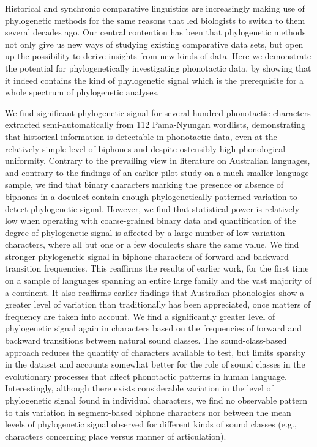 Historical and synchronic comparative linguistics are increasingly making use of phylogenetic methods for the same reasons that led biologists to switch to them several decades ago. Our central contention has been that phylogenetic methods not only give us new ways of studying existing comparative data sets, but open up the possibility to derive insights from new kinds of data. Here we demonstrate the potential for phylogenetically investigating phonotactic data, by showing that it indeed contains the kind of phylogenetic signal which is the prerequisite for a whole spectrum of phylogenetic analyses.

We find significant phylogenetic signal for several hundred phonotactic characters extracted semi-automatically from 112 Pama-Nyungan wordlists, demonstrating that historical information is detectable in phonotactic data, even at the relatively simple level of biphones and despite ostensibly high phonological uniformity. Contrary to the prevailing view in literature on Australian languages, and contrary to the findings of an earlier pilot study on a much smaller language sample, we find that binary characters marking the presence or absence of biphones in a doculect contain enough phylogenetically-patterned variation to detect phylogenetic signal. However, we find that statistical power is relatively low when operating with coarse-grained binary data and quantification of the degree of phylogenetic signal is affected by a large number of low-variation characters, where all but one or a few doculects share the same value. We find stronger phylogenetic signal in biphone characters of forward and backward transition frequencies. This reaffirms the results of earlier work, for the first time on a sample of languages spanning an entire large family and the vast majority of a continent. It also reaffirms earlier findings that Australian phonologies show a greater level of variation than traditionally has been appreciated, once matters of frequency are taken into account. We find a significantly greater level of phylogenetic signal again in characters based on the frequencies of forward and backward transitions between natural sound classes. The sound-class-based approach reduces the quantity of characters available to test, but limits sparsity in the dataset and accounts somewhat better for the role of sound classes in the evolutionary processes that affect phonotactic patterns in human language. Interestingly, although there exists considerable variation in the level of phylogenetic signal found in individual characters, we find no observable pattern to this variation in segment-based biphone characters nor between the mean levels of phylogenetic signal observed for different kinds of sound classes (e.g., characters concerning place versus manner of articulation).

